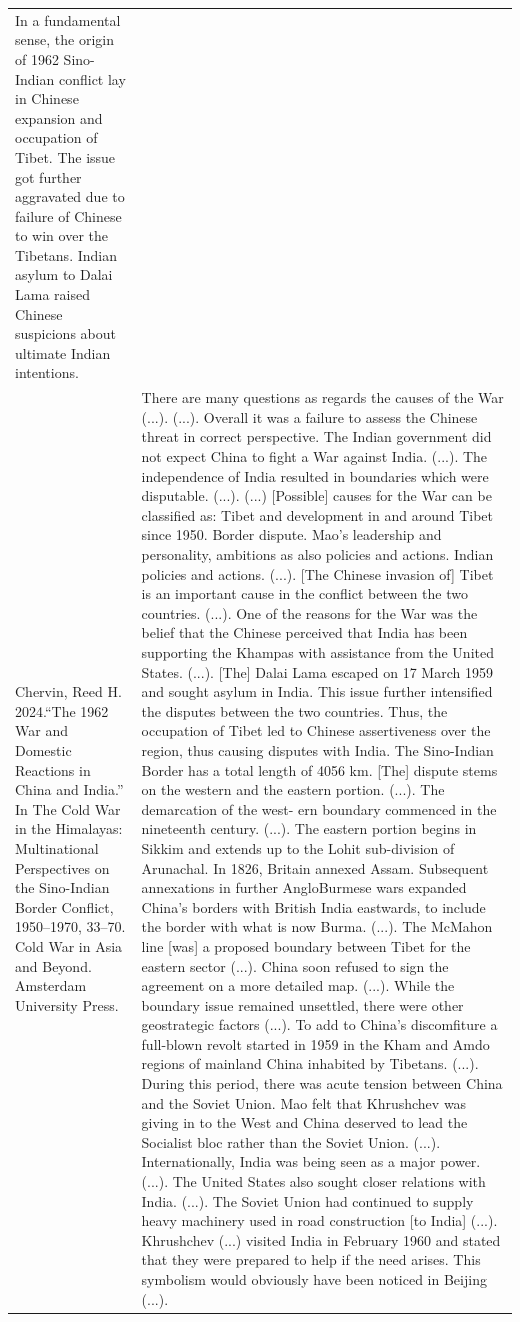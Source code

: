 {\begin{longtable}{p{}p{}}
In a fundamental sense, the origin of 1962 Sino-Indian conflict lay in Chinese expansion and occupation of Tibet. The issue got further aggravated due to failure of Chinese to win over the Tibetans. Indian asylum to Dalai Lama raised Chinese suspicions about ultimate Indian intentions.
\\
Chervin, Reed H. 2024.“The 1962 War and Domestic Reactions in China and India.” In The Cold War in the Himalayas: Multinational Perspectives on the Sino-Indian Border Conflict, 1950–1970, 33–70. Cold War in Asia and Beyond. Amsterdam University Press. & There are many questions as regards the causes of the War (...). (...). Overall it was a failure to assess the Chinese threat in correct perspective. The Indian government did not expect China to fight a War against India. (...). The independence of India resulted in boundaries which were disputable. (...). (...) [Possible] causes for the War can be classified as: Tibet and development in and around Tibet since 1950. Border dispute. Mao's leadership and personality, ambitions as also policies and actions. Indian policies and actions. (...). 
[The Chinese invasion of] Tibet is an important cause in the conflict between the two countries. (...). One of the reasons for the War was the belief that the Chinese perceived that India has been supporting the Khampas with assistance from the United States. (...). [The] Dalai Lama escaped on 17 March 1959 and sought asylum in India. This issue further intensified the disputes between the two countries. Thus, the occupation of Tibet led to Chinese assertiveness over the region, thus causing disputes with India. 
The Sino-Indian Border has a total length of 4056 km. [The] dispute stems on the western and the eastern portion. (...). The demarcation of the west- ern boundary commenced in the nineteenth century. (...). The eastern portion begins in Sikkim and extends up to the Lohit sub-division of Arunachal. In 1826, Britain annexed Assam. Subsequent annexations in further AngloBurmese wars expanded China's borders with British India eastwards, to include the border with what is now Burma. (...). The McMahon line [was] a proposed boundary between Tibet for the eastern sector (...). China soon refused to sign the agreement on a more detailed map. (...). 
While the boundary issue remained unsettled, there were other geostrategic factors (...). To add to China's discomfiture a full-blown revolt started in 1959 in the Kham and Amdo regions of mainland China inhabited by Tibetans. (...). During this period, there was acute tension between China and the Soviet Union. Mao felt that Khrushchev was giving in to the West and China deserved to lead the Socialist bloc rather than the Soviet Union. (...). Internationally, India was being seen as a major power. (...). The United States also sought closer relations with India. (...). The Soviet Union had continued to supply heavy machinery used in road construction [to India] (...). Khrushchev (...) visited India in February 1960 and stated that they were prepared to help if the need arises. This symbolism would obviously have been noticed in Beijing (...).

\end{longtable}}

